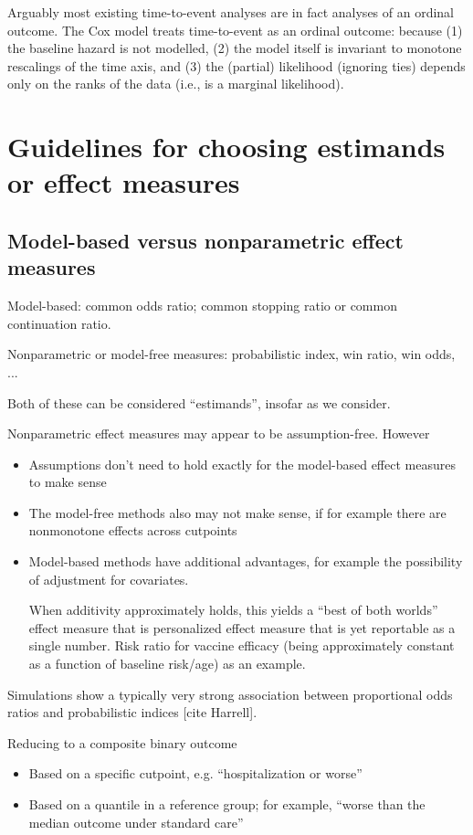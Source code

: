 \documentclass[
  11pt,
  fleqn
]{article}
\begin{document}
Arguably most existing time-to-event analyses are in fact analyses of an
ordinal outcome. The Cox model treats time-to-event as an ordinal outcome:
because (1) the baseline hazard is not modelled, (2) the model itself is
invariant to monotone rescalings of the time axis, and (3) the (partial)
likelihood (ignoring ties) depends only on the ranks of the data (i.e., is a
marginal likelihood).

\section{Guidelines for choosing estimands or effect measures}

\subsection{Model-based versus nonparametric effect measures}

Model-based: common odds ratio; common stopping ratio or common
continuation ratio.

Nonparametric or model-free measures: probabilistic index, win ratio, win odds,
...

Both of these can be considered ``estimands'', insofar as we consider.

Nonparametric effect measures may appear to be assumption-free. However
\begin{itemize}
  \item Assumptions don't need to hold exactly for the model-based
    effect measures to make sense
  \item The model-free methods also may not make sense, if for
    example there are nonmonotone effects across cutpoints
  \item Model-based methods have additional advantages, for example
    the possibility of adjustment for covariates.

    When additivity approximately holds, this yields a ``best of both
    worlds'' effect measure that is
    personalized effect measure that is yet reportable as a single
    number. Risk ratio for vaccine efficacy (being approximately
    constant as a function of baseline risk/age) as an example.
\end{itemize}

Simulations show a typically very strong association between
proportional odds ratios and probabilistic indices [cite Harrell].

Reducing to a composite binary outcome
\begin{itemize}
  \item Based on a specific cutpoint, e.g. ``hospitalization or worse''
  \item Based on a quantile in a reference group; for example,
    ``worse than the median outcome under standard care''
\end{itemize}
\end{document}
